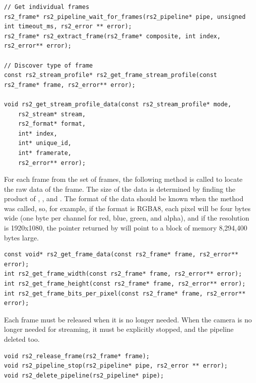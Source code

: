     \begin{lstlisting}[style=CStyle]
// Get individual frames
rs2_frame* rs2_pipeline_wait_for_frames(rs2_pipeline* pipe, unsigned int timeout_ms, rs2_error ** error);
rs2_frame* rs2_extract_frame(rs2_frame* composite, int index, rs2_error** error);

// Discover type of frame
const rs2_stream_profile* rs2_get_frame_stream_profile(const rs2_frame* frame, rs2_error** error);

void rs2_get_stream_profile_data(const rs2_stream_profile* mode, 
    rs2_stream* stream, 
    rs2_format* format, 
    int* index, 
    int* unique_id, 
    int* framerate, 
    rs2_error** error);\end{lstlisting}

    For each frame from the set of frames, the following method is called to locate the raw data of the frame. The size of the data is determined by finding the product of , , and . The format of the data should be known when the  method was called, so, for example, if the format is RGBA8, each pixel will be four bytes wide (one byte per channel for red, blue, green, and alpha), and if the resolution is 1920x1080, the pointer returned by  will point to a block of memory 8,294,400 bytes large.

    \begin{lstlisting}[style=CStyle]
const void* rs2_get_frame_data(const rs2_frame* frame, rs2_error** error);
int rs2_get_frame_width(const rs2_frame* frame, rs2_error** error);
int rs2_get_frame_height(const rs2_frame* frame, rs2_error** error);
int rs2_get_frame_bits_per_pixel(const rs2_frame* frame, rs2_error** error);\end{lstlisting}

    Each frame must be released when it is no longer needed. When the camera is no longer needed for streaming, it must be explicitly stopped, and the pipeline deleted too.
    \begin{lstlisting}[style=CStyle]
void rs2_release_frame(rs2_frame* frame);
void rs2_pipeline_stop(rs2_pipeline* pipe, rs2_error ** error);
void rs2_delete_pipeline(rs2_pipeline* pipe);\end{lstlisting}


